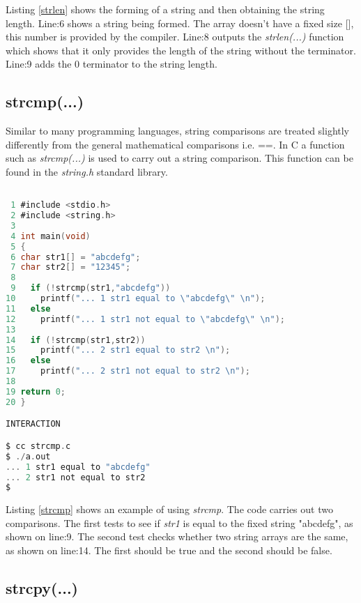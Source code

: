 Listing \ref{strlen} shows the forming of a string and then obtaining the string length. Line:6 shows a string being formed. The array doesn't have a fixed size [], this number is provided by the compiler. Line:8 outputs the \textit{strlen(...)} function which shows that it only provides the length of the string without the terminator. Line:9 adds the 0 terminator to the string length.

\subsection{strcmp(...)}


Similar to many programming languages, string comparisons are treated slightly differently from the general mathematical comparisons i.e. ==. In C a function such as \textit{strcmp(...)} is used to carry out a string comparison. This function can be found in the \textit{string.h} standard library. 

\begin{lstlisting}[language=C,showstringspaces=false,caption={File: strcmp.c},label={strcmp},captionpos=b]

 1 #include <stdio.h>
 2 #include <string.h>
 3 
 4 int main(void)
 5 {
 6 char str1[] = "abcdefg";
 7 char str2[] = "12345";
 8 
 9   if (!strcmp(str1,"abcdefg"))
10     printf("... 1 str1 equal to \"abcdefg\" \n");
11   else
12     printf("... 1 str1 not equal to \"abcdefg\" \n");
13 
14   if (!strcmp(str1,str2))
15     printf("... 2 str1 equal to str2 \n");
16   else
17     printf("... 2 str1 not equal to str2 \n");
18 
19 return 0;
20 }

INTERACTION

$ cc strcmp.c
$ ./a.out
... 1 str1 equal to "abcdefg" 
... 2 str1 not equal to str2 
$

\end{lstlisting}

Listing \ref{strcmp} shows an example of using \textit{strcmp}. The code carries out two comparisons. The first tests to see if \textit{str1} is equal to the fixed string "abcdefg", as shown on line:9. The second test checks whether two string arrays are the same, as shown on line:14. The first should be true and the second should be false.

\subsection{strcpy(...)}

